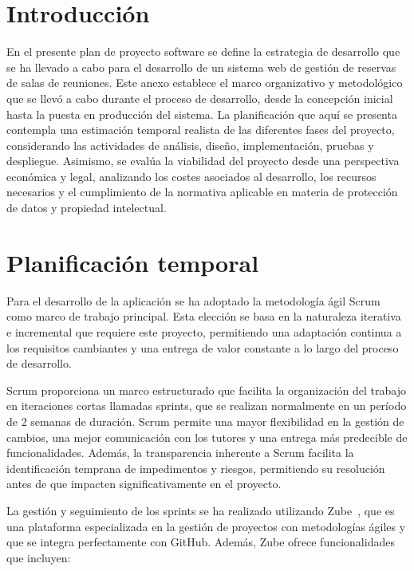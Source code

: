 
\section{Introducción}
En el presente plan de proyecto software se define la estrategia de desarrollo que se ha llevado a cabo para el desarrollo de un sistema web de gestión de reservas de salas de reuniones. Este anexo establece el marco organizativo y metodológico que se llevó a cabo durante el proceso de desarrollo, desde la concepción inicial hasta la puesta en producción del sistema. La planificación que aquí se presenta contempla una estimación temporal realista de las diferentes fases del proyecto, considerando las actividades de análisis, diseño, implementación, pruebas y despliegue. Asimismo, se evalúa la viabilidad del proyecto desde una perspectiva económica y legal, analizando los costes asociados al desarrollo, los recursos necesarios y el cumplimiento de la normativa aplicable en materia de protección de datos y propiedad intelectual.

\section{Planificación temporal}
Para el desarrollo de la aplicación se ha adoptado la metodología ágil Scrum como marco de trabajo principal. Esta elección se basa en la naturaleza iterativa e incremental que requiere este proyecto, permitiendo una adaptación continua a los requisitos cambiantes y una entrega de valor constante a lo largo del proceso de desarrollo.

Scrum proporciona un marco estructurado que facilita la organización del trabajo en iteraciones cortas llamadas sprints, que se realizan normalmente en un período de 2 semanas de duración. Scrum permite una mayor flexibilidad en la gestión de cambios, una mejor comunicación con los tutores y una entrega más predecible de funcionalidades. Además, la transparencia inherente a Scrum facilita la identificación temprana de impedimentos y riesgos, permitiendo su resolución antes de que impacten significativamente en el proyecto.

La gestión y seguimiento de los sprints se ha realizado utilizando Zube~\cite{zube}, que es una plataforma especializada en la gestión de proyectos con metodologías ágiles y que se integra perfectamente con GitHub. Además, Zube ofrece funcionalidades que incluyen:

